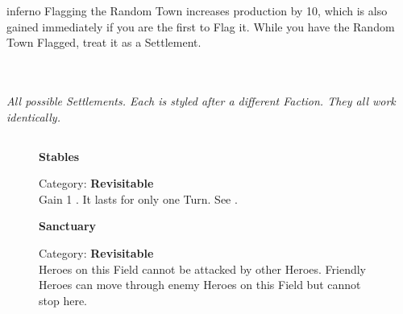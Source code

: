 \begin{multicols}{2}
\begin{expansion}[before=\vspace*{-11mm}]{inferno}
  Flagging the Random Town increases  production by 10, which is also gained immediately if you are the first to Flag it.
  While you have the Random Town Flagged, treat it as a Settlement.
\end{expansion}

\end{multicols}
\vspace*{\fill}

\begin{center}
  \\
  \\
  \textit{All possible Settlements.
  Each is styled after a different Faction.
  They all work identically.}
\end{center}
\vspace*{\fill}
\pagebreak

\subsection*{}

\begin{figure}[H]
  \begin{minipage}[t]{0.47\textwidth}
    \vspace{0pt}
    \centering
    \phantom{j}\textbf{Stables}\phantom{j}\par
    \caption{\small Category: \textbf{Revisitable}\\
      Gain 1 .
      It lasts for only one Turn.
      See \protect{}.
    }
  \end{minipage}\hfill
  \begin{minipage}[t]{0.47\textwidth}
    \vspace{0pt}
    \centering
    \textbf{Sanctuary}\par
    \caption{\small Category: \textbf{Revisitable}\\
      Heroes on this Field cannot be attacked by other Heroes.
      Friendly Heroes can move through enemy Heroes on this Field but cannot stop here.}
  \end{minipage}
\end{figure}

